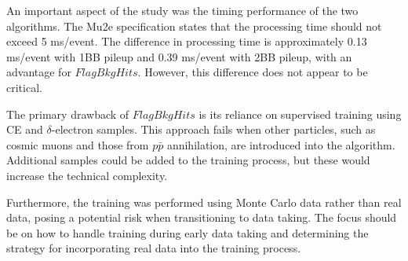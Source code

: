 An important aspect of the study was the 
timing performance of the two algorithms. The Mu2e specification states 
that the processing time should not exceed 5 ms/event. The 
difference in processing time is approximately 0.13 ms/event with 
1BB pileup and 0.39 ms/event with 2BB pileup, with an advantage for $FlagBkgHits$. 
However, this difference does not appear to be critical.

The primary drawback of $FlagBkgHits$ is its 
reliance on supervised training using 
CE and $\delta$-electron samples. This 
approach fails when other particles, such 
as cosmic muons and those from $p\bar{p}$ 
annihilation, are introduced into the algorithm.
Additional samples could be added to the training 
process, but these would increase the technical complexity. 

Furthermore, the training was performed using  
Monte Carlo data rather than  real data, 
posing a potential risk when transitioning 
to  data taking. The focus should be on how 
to handle training during early data taking and 
determining the strategy for incorporating real data into the training process.

